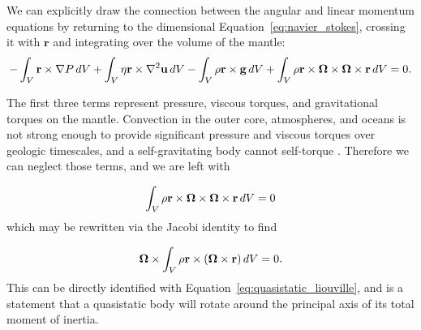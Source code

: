 \documentclass[extra,mreferee]{gji}
\newif\ifdetail
\begin{document}
We can explicitly draw the connection between the angular and linear momentum equations by returning to the dimensional
Equation~\eqref{eq:navier_stokes}, crossing it with $\mathbf{r}$ and integrating over the volume of the mantle:
\begin{equation}
\begin{aligned}
-\int_V \mathbf{r} \times \nabla P \,dV + \int_V \eta \mathbf{r} \times \nabla^2 \mathbf{u} \,dV - \int_V \rho \mathbf{r} \times \mathbf{g} \,dV 
   + \int_V \rho \mathbf{r} \times \mitbf{\Omega} \times \mitbf{\Omega} \times \mathbf{r}  \,dV &= 0. \\
\end{aligned}
\end{equation}


The first three terms represent pressure, viscous torques, and gravitational torques on the mantle.  
Convection in the outer core, atmospheres, and oceans is not strong enough to provide significant pressure and viscous torques over geologic timescales, and a self-gravitating body cannot self-torque \citep{braginsky1995equations}.
Therefore we can neglect those terms, and we are left with

\begin{equation}
\begin{aligned}
\int_V \rho \mathbf{r} \times \mitbf{\Omega} \times \mitbf{\Omega} \times \mathbf{r} \,dV &= 0 \\
\label{eq:quasistatic_angular_momentum}
\end{aligned}
\end{equation}
which may be rewritten via the Jacobi identity to find
\ifdetail
\begin{equation}
\begin{aligned}
- \int_V \rho (\mitbf{\Omega}\times \mathbf{r}) \times ( \mathbf{r} \times \mitbf{\Omega} ) \,dV + 
- \int_V \rho \mitbf{\Omega}\times(\mitbf{\Omega}\times \mathbf{r}) \times \mathbf{r} \,dV &= 0 \\
\end{aligned}
\end{equation}
\fi
\begin{equation}
\begin{aligned}
 \mitbf{\Omega} \times \int_V \rho \mathbf{r} \times (\mitbf{\Omega}\times \mathbf{r}) \,dV &= 0. \\
\end{aligned}
\end{equation}
This can be directly identified with Equation~\eqref{eq:quasistatic_liouville},
and is a statement that a quasistatic body will rotate around the principal axis of its total moment of inertia.
\end{document}
